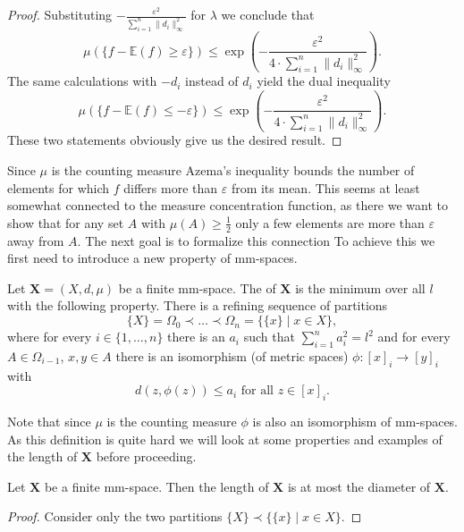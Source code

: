 \begin{proof}
Substituting $-\frac{\varepsilon^2}{\sum_{i=1}^{n}\|d_i\|_\infty^2}$ for $\lambda$ we conclude that
\[\mu(\{f-\mathbb{E}(f)\geq \varepsilon\})\leq\exp\left(-\frac{\varepsilon^2}{4\cdot\sum_{i=1}^{n}\|d_i\|^2_\infty}\right). \]
The same calculations with $-d_i$ instead of $d_i$ yield the dual inequality
\[\mu(\{f-\mathbb{E}(f)\leq -\varepsilon\})\leq\exp\left(-\frac{\varepsilon^2}{4\cdot\sum_{i=1}^{n}\|d_i\|^2_\infty}\right). \]
These two statements obviously give us the desired result.
\end{proof}

Since $\mu$ is the counting measure Azema's inequality bounds the number of elements for which $f$ differs more than $\varepsilon$ from its mean. This seems at least somewhat connected to the measure concentration function, as there we want to show that for any set $A$ with $\mu(A)\geq\frac{1}{2}$ only a few elements are more than $\varepsilon$ away from $A$.
The next goal is to formalize this connection %
To achieve this we first need to introduce a new property of mm-spaces.
\begin{definition}\label{def:length}
Let $\boldsymbol{X}=(X,d,\mu)$ be a finite mm-space. The  of $\boldsymbol X$ is the minimum over all $l$ with the following property. There is a refining sequence of partitions 
\[\{X\}=\Omega_0\prec\dots\prec\Omega_n=\{\{x\}\mid x\in X\},\]
where for every $i\in\{1,\dots,n\}$ there is an $a_i$ such that $\sum_{i=1}^{n}a^2_i=l^2$ and for every $A\in \Omega_{i-1}$, $x,y\in A$ there is an isomorphism (of metric spaces) $\phi\colon[x]_i\to [y]_i$ with 
\[d(z,\phi(z))\leq a_i\text{ for all $z\in[x]_i$.}\]
\end{definition}

Note that since $\mu$ is the counting measure $\phi$ is also an isomorphism of mm-spaces.
As this definition is quite hard we will look at some properties and examples of the length of $\boldsymbol{X}$ before proceeding.
\begin{lemma}
Let $\boldsymbol{X}$ be a finite mm-space. Then the length of $\boldsymbol{X}$ is at most the diameter of $\boldsymbol{X}$.
\end{lemma}
\begin{proof}
Consider only the two partitions $\{X\}\prec\{\{x\}\mid x\in X\}$.
\end{proof}

